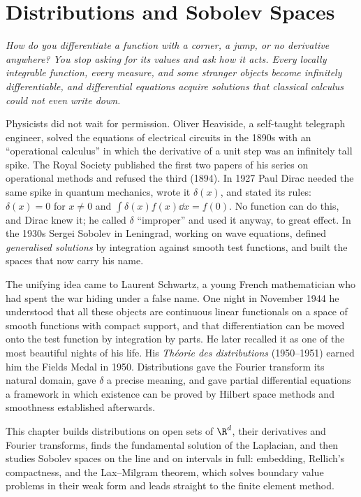 \chapter{Distributions and Sobolev Spaces}

\begin{center}\itshape
How do you differentiate a function with a corner, a jump, or no derivative anywhere? You stop asking for its values and ask how it
acts. Every locally integrable function, every measure, and some stranger objects become infinitely differentiable, and
differential equations acquire solutions that classical calculus could not even write down.
\end{center}

Physicists did not wait for permission. Oliver Heaviside, a self-taught telegraph engineer, solved the equations of electrical
circuits in the 1890s with an ``operational calculus'' in which the derivative of a unit step was an infinitely tall spike. The Royal
Society published the first two papers of his series on operational methods and refused the third (1894). In 1927 Paul Dirac needed the same spike in quantum mechanics, wrote it $\delta(x)$, and stated
its rules: $\delta(x)=0$ for $x\ne0$ and $\int\delta(x)f(x)\dd x=f(0)$. No function can do this, and Dirac knew it; he called $\delta$
``improper'' and used it anyway, to great effect. In the 1930s Sergei Sobolev in Leningrad, working on wave equations, defined
\emph{generalised solutions} by integration against smooth test functions, and built the spaces that now carry his name.

The unifying idea came to Laurent Schwartz, a young French mathematician who had spent the war hiding under a false name. One night in
November 1944 he understood that all these objects are continuous linear functionals on a space of smooth functions with compact
support, and that differentiation can be moved onto the test function by integration by parts. He later recalled it as one of the most
beautiful nights of his life. His \emph{Th\'eorie des distributions} (1950--1951) earned him the Fields Medal in 1950. Distributions
gave the Fourier transform its natural domain, gave $\delta$ a precise meaning, and gave partial differential equations a framework in
which existence can be proved by Hilbert space methods and smoothness established afterwards.

This chapter builds distributions on open sets of $\R^d$, their derivatives and Fourier transforms, finds the fundamental solution of
the Laplacian, and then studies Sobolev spaces on the line and on intervals in full: embedding, Rellich's compactness, and the
Lax--Milgram theorem, which solves boundary value problems in their weak form and leads straight to the finite element method.

